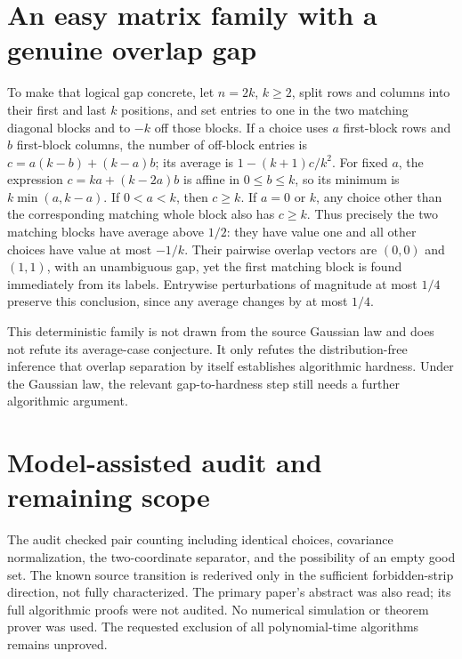 \documentclass[11pt]{article}
\begin{document}
\section{An easy matrix family with a genuine overlap gap}
To make that logical gap concrete, let $n=2k$, $k\ge2$, split rows and
columns into their first and last $k$ positions, and set entries to one
in the two matching diagonal blocks and to $-k$ off those blocks.
If a choice uses $a$ first-block rows and $b$ first-block columns,
the number of off-block entries is
$c=a(k-b)+(k-a)b$; its average is $1-(k+1)c/k^2$.
For fixed $a$, the expression $c=ka+(k-2a)b$ is affine in
$0\le b\le k$, so its minimum is $k\min(a,k-a)$.
If $0<a<k$, then $c\ge k$. If $a=0$ or $k$, any choice other
than the corresponding matching whole block also has $c\ge k$.
Thus precisely the two matching blocks have average above $1/2$:
they have value one and all other choices have value at most $-1/k$.
Their pairwise overlap vectors are $(0,0)$ and $(1,1)$, with an
unambiguous gap, yet the first matching block is found immediately
from its labels. Entrywise perturbations of magnitude at most $1/4$
preserve this conclusion, since any average changes by at most $1/4$.

This deterministic family is not drawn from the source Gaussian law
and does not refute its average-case conjecture. It only refutes the
distribution-free inference that overlap separation by itself establishes
algorithmic hardness. Under the Gaussian law, the relevant gap-to-hardness
step still needs a further algorithmic argument.

\section{Model-assisted audit and remaining scope}
The audit checked pair counting including identical choices, covariance
normalization, the two-coordinate separator, and the possibility of an
empty good set. The known source transition is rederived only in the
sufficient forbidden-strip direction, not fully characterized. The
primary paper's abstract was also read; its full algorithmic proofs
were not audited. No numerical simulation or theorem prover was used.
The requested exclusion of all polynomial-time algorithms remains unproved.
\end{document}
